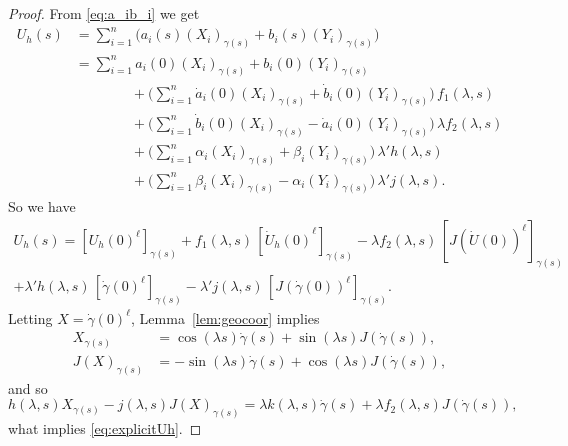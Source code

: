 \documentclass[10pt]{amsart}
\theoremstyle{definition}
\theoremstyle{remark}
\numberwithin{equation}{section}
\begin{document}
\begin{proof}
From \eqref{eq:a_ib_i} we get
\begin{equation*}
\begin{split}
U_h(s)&=\sum_{i=1}^n\big(a_i(s) (X_i)_{{\gamma}(s)}+b_i(s) (Y_i)_{{\gamma}(s)}\big)
\\
&=\sum_{i=1}^na_i(0)(X_i)_{{\gamma}(s)}+b_i(0)(Y_i)_{{\gamma}(s)}
\\
&\qquad\qquad+\bigg(\sum_{i=1}^n\dot{a}_i(0)(X_i)_{{\gamma}(s)}+\dot{b}_i(0)(Y_i)_{{\gamma}(s)}\bigg)\,f_1({\lambda}, s)
\\
&\qquad\qquad+\bigg(\sum_{i=1}^n\dot{b}_i(0)(X_i)_{{\gamma}(s)}-\dot{a}_i(0)(Y_i)_{{\gamma}(s)}\bigg)\,{\lambda} f_2({\lambda}, s)
\\
&\qquad\qquad+\bigg(\sum_{i=1}^n \alpha_i(X_i)_{{\gamma}(s)}+\beta_i(Y_i)_{{\gamma}(s)}\bigg)\,{\lambda}' h({\lambda}, s)
\\
&\qquad\qquad+\bigg(\sum_{i=1}^n\beta_i(X_i)_{{\gamma}(s)}-\alpha_i(Y_i)_{{\gamma}(s)}\bigg)\,{\lambda}' j({\lambda}, s).
\end{split}
\end{equation*}
So we have
\begin{multline}
\label{eq:U_hcompact}
U_h(s)=[{{U_h(0)}^\ell}]_{{\gamma}(s)}+f_1({\lambda}, s)\,[{{\dot{U}_h(0)}^\ell}]_{{\gamma}(s)}-{\lambda} f_2({\lambda}, s)\,[{{J(\dot{U}(0))}^\ell}]_{{\gamma}(s)}
\\
+{\lambda}'h({\lambda}, s)\,[{{{\dot{\gamma}}(0)}^\ell}]_{{\gamma}(s)}-{\lambda}'j({\lambda}, s)\,[{{J({\dot{\gamma}}(0))}^\ell}]_{{\gamma}(s)}.
\end{multline}
Letting $X={\dot{\gamma}}(0)^\ell$, Lemma~\ref{lem:geocoor} implies
\begin{align*}
X_{{\gamma}(s)}&=\cos({\lambda} s){\dot{\gamma}}(s)+\sin({\lambda} s)J({\dot{\gamma}}(s)),
\\
J(X)_{{\gamma}(s)}&=-\sin({\lambda} s){\dot{\gamma}}(s)+\cos({\lambda} s)J({\dot{\gamma}}(s)),
\end{align*}
and so
\[
h({\lambda}, s)X_{{\gamma}(s)}-j({\lambda}, s)J(X)_{{\gamma}(s)}={\lambda} k({\lambda}, s){\dot{\gamma}}(s)+{\lambda} f_2({\lambda}, s)J({\dot{\gamma}}(s)),
\]
what implies \eqref{eq:explicitUh}.

\end{proof}
\end{document}
